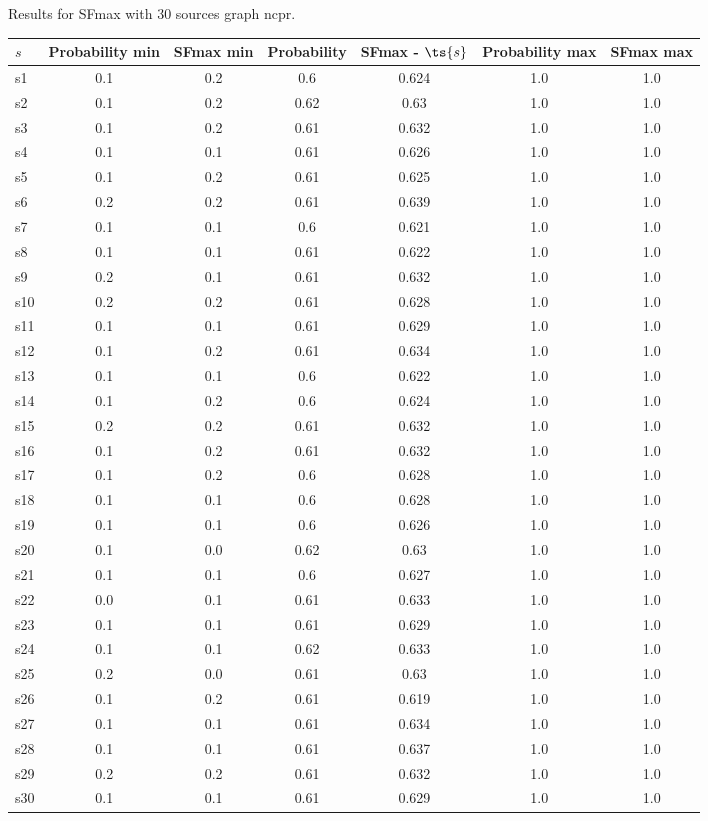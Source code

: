 \documentclass{article}
\begin{document}
\noindent Results for SFmax with 30 sources graph ncpr.

\noindent\begin{tabular}{|l|c|c|c|c|c|c|}
\hline
$s$& Probability min & SFmax min & Probability & SFmax - $\ts{s}$ & Probability max & SFmax max\\
\hline
s1 &0.1 & 0.2 & 0.6 & 0.624 & 1.0 & 1.0\\
\hline
s2 &0.1 & 0.2 & 0.62 & 0.63 & 1.0 & 1.0\\
\hline
s3 &0.1 & 0.2 & 0.61 & 0.632 & 1.0 & 1.0\\
\hline
s4 &0.1 & 0.1 & 0.61 & 0.626 & 1.0 & 1.0\\
\hline
s5 &0.1 & 0.2 & 0.61 & 0.625 & 1.0 & 1.0\\
\hline
s6 &0.2 & 0.2 & 0.61 & 0.639 & 1.0 & 1.0\\
\hline
s7 &0.1 & 0.1 & 0.6 & 0.621 & 1.0 & 1.0\\
\hline
s8 &0.1 & 0.1 & 0.61 & 0.622 & 1.0 & 1.0\\
\hline
s9 &0.2 & 0.1 & 0.61 & 0.632 & 1.0 & 1.0\\
\hline
s10 &0.2 & 0.2 & 0.61 & 0.628 & 1.0 & 1.0\\
\hline
s11 &0.1 & 0.1 & 0.61 & 0.629 & 1.0 & 1.0\\
\hline
s12 &0.1 & 0.2 & 0.61 & 0.634 & 1.0 & 1.0\\
\hline
s13 &0.1 & 0.1 & 0.6 & 0.622 & 1.0 & 1.0\\
\hline
s14 &0.1 & 0.2 & 0.6 & 0.624 & 1.0 & 1.0\\
\hline
s15 &0.2 & 0.2 & 0.61 & 0.632 & 1.0 & 1.0\\
\hline
s16 &0.1 & 0.2 & 0.61 & 0.632 & 1.0 & 1.0\\
\hline
s17 &0.1 & 0.2 & 0.6 & 0.628 & 1.0 & 1.0\\
\hline
s18 &0.1 & 0.1 & 0.6 & 0.628 & 1.0 & 1.0\\
\hline
s19 &0.1 & 0.1 & 0.6 & 0.626 & 1.0 & 1.0\\
\hline
s20 &0.1 & 0.0 & 0.62 & 0.63 & 1.0 & 1.0\\
\hline
s21 &0.1 & 0.1 & 0.6 & 0.627 & 1.0 & 1.0\\
\hline
s22 &0.0 & 0.1 & 0.61 & 0.633 & 1.0 & 1.0\\
\hline
s23 &0.1 & 0.1 & 0.61 & 0.629 & 1.0 & 1.0\\
\hline
s24 &0.1 & 0.1 & 0.62 & 0.633 & 1.0 & 1.0\\
\hline
s25 &0.2 & 0.0 & 0.61 & 0.63 & 1.0 & 1.0\\
\hline
s26 &0.1 & 0.2 & 0.61 & 0.619 & 1.0 & 1.0\\
\hline
s27 &0.1 & 0.1 & 0.61 & 0.634 & 1.0 & 1.0\\
\hline
s28 &0.1 & 0.1 & 0.61 & 0.637 & 1.0 & 1.0\\
\hline
s29 &0.2 & 0.2 & 0.61 & 0.632 & 1.0 & 1.0\\
\hline
s30 &0.1 & 0.1 & 0.61 & 0.629 & 1.0 & 1.0\\
\hline
\end{tabular}\\
\end{document}
